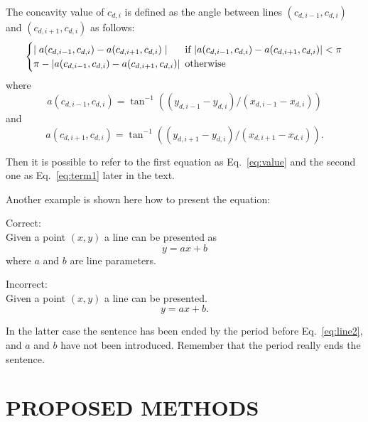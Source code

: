 \documentclass{lutmscthesis}[2017/10/03]
\begin{document}
The concavity value of $c_{d,i}$ is defined as the angle between lines $(c_{d,i-1} , c_{d,i} )$ and $(c_{d,i+1} , c_{d,i})$ as follows:
\begin{align}
\label{eq:value}
\begin{cases}
\mid a(c_{d,i-1} , c_{d,i} ) - a(c_{d,i+1} , c_{d,i} )\mid & \hspace{-5pt}\text{if}  \ |a(c_{d,i-1} , c_{d,i} ) - a(c_{d,i+1} , c_{d,i} )| < \pi\\
\pi  - |a(c_{d,i-1} , c_{d,i} ) - a(c_{d,i+1} ,c_{d,i})| & \hspace{-5pt} \text{otherwise} 
\end{cases}
\end{align}
where 
\begin{equation}
a(c_{d,i-1} , c_{d,i} ) = \tan^{-1} ((y_{d,i-1} - y_{d,i} )/(x_{d,i-1} - x_{d,i} ))
\label{eq:term1}
\end{equation}
and
\begin{equation}
a(c_{d,i+1} , c_{d,i}) = \tan ^{-1} ((y_{d,i+1} - y_{d,i} )/(x_{d,i+1} - x_{d,i} )).
\end{equation}

Then it is possible to refer to the first equation as Eq.~\ref{eq:value} and the second one as Eq.~\ref{eq:term1} later in the text. 

Another example is shown here how to present the equation: 

Correct:\\
Given a point $(x,y)$ a line can be presented as 
\begin{equation}
y = ax + b
\label{eq:line1}
\end{equation}
where $a$ and $b$ are line parameters. 

Incorrect:\\ 
Given a point $(x,y)$ a line can be presented.  
\begin{equation}
y = ax + b.
\label{eq:line2}
\end{equation}

In the latter case  the sentence has been ended by the period before Eq.~\ref{eq:line2}, 
and $a$ and $b$ have not been introduced. 
Remember that the period really ends the sentence. 

\section{PROPOSED METHODS}
\label{sec:proposed}
\end{document}
